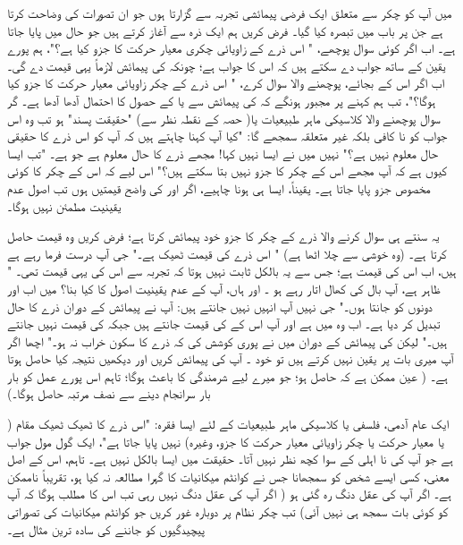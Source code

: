 میں آپ کو     چکر سے متعلق ایک فرضی  پیمائشی  تجربہ  سے گزارتا ہوں جو  ان تصورات  کی وضاحت کرتا ہے جن پر باب   میں  تبصرہ  کیا گیا۔ فرض کریں ہم  ایک ذرہ سے آغاز کرتے ہیں جو   حال میں پایا جاتا ہے۔ اب اگر کوئی سوال  پوچھے، " اس ذرے کے  زاویائی چکری معیار حرکت کا     جزو  کیا ہے؟"،   ہم پورے یقین کے ساتھ جواب دے سکتے ہیں کہ اس کا جواب   
    ہے؛  چونکہ    کی پیمائش  لازماً  یہی قیمت دے گی۔اب اگر  اس کے بجائے،  پوچھنے والا سوال کرے، " اس ذرے کے  چکر    زاویائی معیار حرکت کا    جزو  کیا ہوگا؟"،  تب ہم  کہنے پر مجبور ہونگے کہ     کی پیمائش سے       یا     کے حصول کا احتمال آدھا آدھا ہے۔ گر  سوال پوچھنے والا کلاسیکی ماہر  طبیعیات       
 یا( حصہ  کے نقطہ نظر  سے)  "حقیقت پسند"  ہو تب  وہ اس جواب کو نا کافی بلکہ غیر متعلقہ  سمجھے گا:  "کیا آپ  کہنا چاہتے ہیں کہ آپ کو اس ذرے کا حقیقی حال معلوم نہیں ہے؟"  نہیں میں نے ایسا  نہیں کہا!  مجھے ذرے کا حال    معلوم ہے جو     ہے۔ "تب ایسا کیوں ہے کہ آپ مجھے اس کے چکر کا  جزو  نہیں بتا سکتے ہیں؟"  اس لیے کہ اس کے چکر کا کوئی مخصوص  جزو  پایا جاتا ہے۔ یقیناً، ایسا ہی ہونا چاہیے،   اگر    اور   کی واضح  قیمتیں     ہوں تب اصول عدم یقینیت مطمئن  نہیں ہوگا۔
 
  یہ سنتے ہی سوال کرنے والا ذرے کے چکر کا    جزو    خود پیمائش کرتا ہے؛   فرض کریں  وہ     قیمت حاصل کرتا ہے۔ (وہ خوشی  سے چلا اٹھا ہے) "  اس ذرے کی   
 قیمت ٹھیک    ہے۔"  جی آپ درست فرما  رہے ہے  ہیں،  اب اس کی   قیمت ہے؛ جس سے یہ بالکل ثابت نہیں ہوتا کہ تجربہ سے   اس کی یہی قیمت تھی۔ " ظاہر ہے، آپ  بال کی کھال اتار رہے ہو ۔ اور ہاں،   آپ کے عدم یقینیت اصول کا کیا بنا؟  میں اب     اور       دونوں کو جانتا ہوں۔"  جی نہیں آپ انہیں نہیں  جانتے   ہیں:  آپ نے پیمائش کے دوران ذرے کا حال تبدیل کر دیا ہے۔ اب وہ     میں ہے    اور    آپ اس کے   کی قیمت جانتے ہیں جبکہ     کی قیمت  نہیں جانتے ہیں۔" لیکن       کی پیمائش کے دوران میں  نے پوری کوشش  کی کہ  ذرے کا سکون   خراب   نہ  ہو۔" اچھا اگر آپ میری بات پر یقین نہیں کرتے ہیں  تو خود ۔ آپ   کی پیمائش کریں اور دیکھیں نتیجہ کیا حاصل ہوتا ہے۔ ( عین ممکن ہے
  کہ    حاصل ہو؛  جو میرے لیے شرمندگی کا باعث  ہوگا؛ تاہم  اس پورے عمل کو بار بار  سرانجام دینے سے   نصف   مرتبہ     حاصل ہوگا۔)
  
   ایک عام آدمی،  فلسفی  یا   کلاسیکی ماہر طبیعیات کے لئے ایسا فقرہ:  "اس ذرے  کا ٹھیک ٹھیک مقام ( یا معیار حرکت یا چکر زاویائی معیار حرکت کا   جزو،  وغیرہ)  نہیں پایا جاتا ہے"،   ایک گول مول جواب ہے  جو آپ کی نا اہلی کے سوا کچھ نظر نہیں آتا۔ حقیقت میں ایسا بالکل   نہیں ہے۔ تاہم، اس کے  اصل معنی، کسی ایسے شخص کو سمجھانا جس نے کوانٹم میکانیات کا گہرا  مطالعہ نہ کیا ہو، تقریباً  ناممکن ہے۔ اگر آپ کی عقل  دنگ رہ گئی ہو  (  اگر آپ کی عقل دنگ نہیں رہی تب اس کا مطلب ہوگا کہ آپ کو کوئی بات سمجھ ہی نہیں آئی)   تب     چکر نظام پر  دوبارہ  غور کریں جو  کوانٹم میکانیات کی   تصوراتی پیچیدگیوں  کو جاننے  کی سادہ ترین مثال ہے۔


